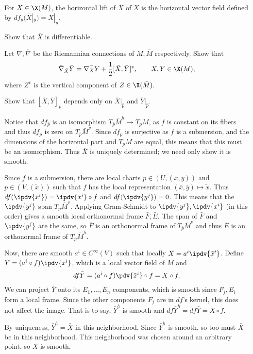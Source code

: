     For $X\in\X(M)$, the {\emphcolor horizontal lift} of $\bar X$ of $X$ is the horizontal vector field defined by $df_{\bar p}(\bar X|_{\bar p})=X|_p$.
    \benum
        \item Show that $\bar X$ is differentiable.
        \item Let $\nabla,\bar\nabla$ be the Riemannian connections of $M,\bar M$ respectively.
        Show that
        $$ \bar\nabla_{\bar X}\bar Y = \bar{\nabla_XY} + \frac12[\bar X,\bar Y]^v,\qquad X,Y\in\X(M) , $$
        where $Z^v$ is the vertical component of $Z\in\X(\bar M)$.
        \item Show that $[\bar X,\bar Y]_{\bar p}$ depends only on $\bar X|_{\bar p}$ and $\bar Y|_{\bar p}$.
    \eenum

\eprob

\benum
    \item Notice that $df_{\bar p}$ is an isomorphism $T_{\bar p}\bar M^h\to T_pM$, as $f$ is constant on its fibers and thus $df_p$ is zero on $T_{\bar p}\bar M^v$.
    Since $df_p$ is surjective as $f$ is a submersion, and the dimensions of the horizontal part and $T_pM$ are equal, this means that this must be an isomorphism.
    Thus $\bar X$ is uniquely determined; we need only show it is smooth.

    Since $f$ is a submersion, there are local charts $\bar p\in(U,(\bar x,\bar y))$ and $p\in(V,(\tilde x))$ such that $f$ has the local representation $(\bar x,\bar y)\mapsto\tilde x$.
    Thus $df(\ipdv{x^i})=\ipdv{\tilde x^i}\circ f$ and $df(\ipdv{y^j})=0$.
    This means that the $\ipdv{y^j}$ span $T_{\bar p}\bar M^v$.
    Applying Gram-Schmidt to $\ipdv{y^j},\ipdv{x^i}$ (in this order) gives a smooth local orthonormal frame $\bar F,\bar E$.
    The span of $\bar F$ and $\ipdv{y^j}$ are the same, so $\bar F$ is an orthonormal frame of $T_{\bar p}\bar M^v$ and thus $\bar E$ is an orthonormal frame of $T_{\bar p}\bar M^h$.

    Now, there are smooth $a^i\in C^\infty(V)$ such that locally $X=a^i\ipdv{\tilde x^i}$.
    Define $\bar Y=(a^i\circ f)\ipdv{x^i}$, which is a local vector field of $\bar M$ and
    $$ df\bar Y = (a^i\circ f)\pdv{\tilde x^i}\circ f = X\circ f . $$
    We can project $\bar Y$ onto its $E_1,\dots,E_n$ components, which is smooth since $F_j,E_i$ form a local frame.
    Since the other components $F_j$ are in $df$'s kernel, this does not affect the image.
    That is to say, $\bar Y^h$ is smooth and $df\bar Y^h=df\bar Y=X\circ f$.

    By uniqueness, $\bar Y^h=\bar X$ in this neighborhood.
    Since $\bar Y^h$ is smooth, so too must $\bar X$ be in this neighborhood.
    This neighborhood was chosen around an arbitrary point, so $\bar X$ is smooth.

